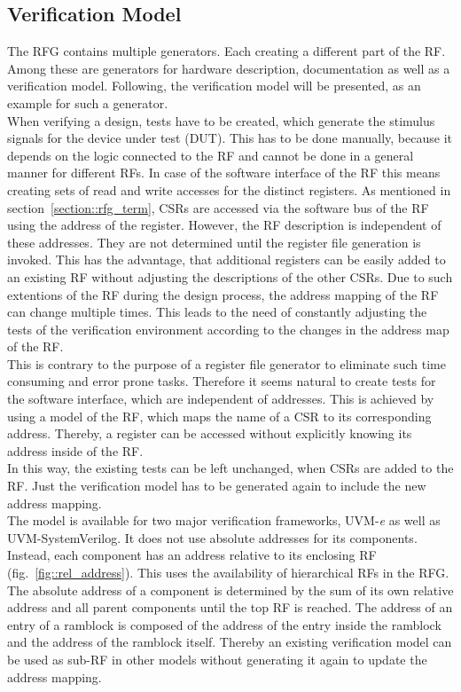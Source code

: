 \subsection{Verification Model}
The RFG contains multiple generators. Each creating a different part of the RF. Among these are generators for hardware description, documentation as well as a verification model. Following, the verification model will be presented, as an example for such a generator.\\
When verifying a design, tests have to be created, which generate the stimulus signals for the device under test (DUT). This has to be done manually, because it depends on the logic connected to the RF and cannot be done in a general manner for different RFs. In case of the software interface of the RF this means creating sets of read and write accesses for the distinct registers. As mentioned in section~\ref{section::rfg_term}, CSRs are accessed via the software bus of the RF using the address of the register. However, the RF description is independent of these addresses. They are not determined until the register file generation is invoked. This has the advantage, that additional registers can be easily added to an existing RF without adjusting the descriptions of the other CSRs. Due to such extentions of the RF during the design process, the address mapping of the RF can change multiple times. This leads to the need of constantly adjusting the tests of the verification environment according to the changes in the address map of the RF.\\
This is contrary to the purpose of a register file generator to eliminate such time consuming and error prone tasks. Therefore it seems natural to create tests for the software interface, which are independent of addresses. This is achieved by using a model of the RF, which maps the name of a CSR to its corresponding address. Thereby, a register can be accessed without explicitly knowing its address inside of the RF.\\
In this way, the existing tests can be left unchanged, when CSRs are added to the RF. Just the verification model has to be generated again to include the new address mapping.\\
The model is available for two major verification frameworks, UVM-\textit{e} as well as UVM-SystemVerilog. It does not use absolute addresses for its components. Instead, each component has an address relative to its enclosing RF (fig.~\ref{fig::rel_address}). This uses the availability of hierarchical RFs in the RFG. The absolute address of a component is determined by the sum of its own relative address and all parent components until the top RF is reached. The address of an entry of a ramblock is composed of the address of the entry inside the ramblock and the address of the ramblock itself. Thereby an existing verification model can be used as sub-RF in other models without generating it again to update the address mapping.
